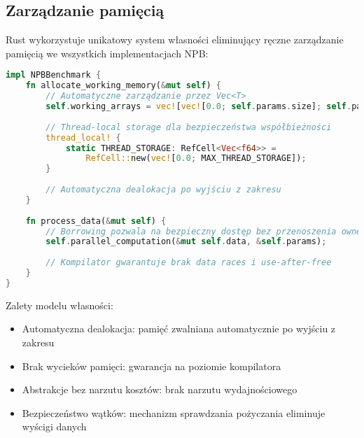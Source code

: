 \subsection{Zarządzanie pamięcią}
Rust wykorzystuje unikatowy system własności eliminujący ręczne zarządzanie pamięcią we wszystkich implementacjach NPB:
\begin{lstlisting}[language=Rust, caption={Zarządzanie pamięcią w benchmarkach NPB w języku Rust}, label={lst:rust_memory_management}]
impl NPBBenchmark {
    fn allocate_working_memory(&mut self) {
        // Automatyczne zarządzanie przez Vec<T>
        self.working_arrays = vec![vec![0.0; self.params.size]; self.params.dimensions];
        
        // Thread-local storage dla bezpieczeństwa współbieżności
        thread_local! {
            static THREAD_STORAGE: RefCell<Vec<f64>> = 
                RefCell::new(vec![0.0; MAX_THREAD_STORAGE]);
        }
        
        // Automatyczna dealokacja po wyjściu z zakresu
    }
    
    fn process_data(&mut self) {
        // Borrowing pozwala na bezpieczny dostęp bez przenoszenia ownership
        self.parallel_computation(&mut self.data, &self.params);
        
        // Kompilator gwarantuje brak data races i use-after-free
    }
}
\end{lstlisting}
Zalety modelu własności:
\begin{itemize}
    \item Automatyczna dealokacja: pamięć zwalniana automatycznie po wyjściu z zakresu
    \item Brak wycieków pamięci: gwarancja na poziomie kompilatora
    \item Abstrakcje bez narzutu kosztów: brak narzutu wydajnościowego
    \item Bezpieczeństwo wątków: mechanizm sprawdzania pożyczania eliminuje wyścigi danych
\end{itemize}

